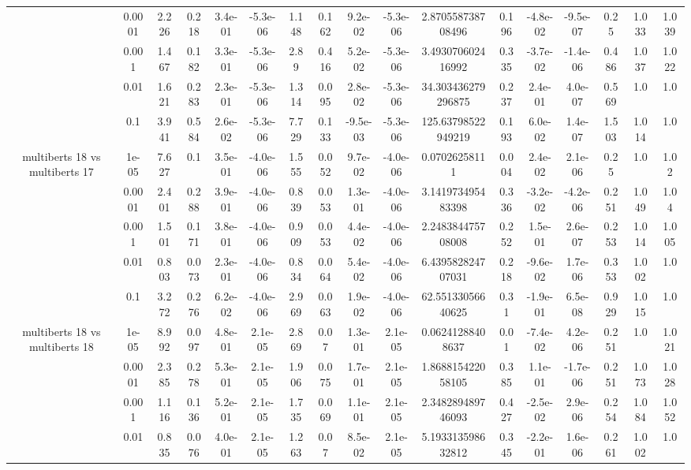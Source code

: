 \begin{tabular}{|c|c|c|c|c|c|c|c|c|c|c|c|c|c|c|c|c|}
 & 0.0001 & 2.226 & 0.218 & 3.4e-01 & -5.3e-06 & 1.148 & 0.162 & 9.2e-02 & -5.3e-06 & 2.870558738708496 & 0.196 & -4.8e-02 & -9.5e-07 & 0.25 & 1.033 & 1.039 \\
 & 0.001 & 1.467 & 0.182 & 3.3e-01 & -5.3e-06 & 2.89 & 0.416 & 5.2e-02 & -5.3e-06 & 3.493070602416992 & 0.335 & -3.7e-02 & -1.4e-06 & 0.486 & 1.037 & 1.022 \\
 & 0.01 & 1.621 & 0.283 & 2.3e-01 & -5.3e-06 & 1.314 & 0.095 & 2.8e-02 & -5.3e-06 & 34.303436279296875 & 0.237 & 2.4e-01 & 4.0e-07 & 0.569 & 1.0 & 1.0 \\
 & 0.1 & 3.941 & 0.584 & 2.6e-02 & -5.3e-06 & 7.729 & 0.133 & -9.5e-03 & -5.3e-06 & 125.63798522949219 & 0.193 & 6.0e-02 & 1.4e-07 & 1.503 & 1.014 & 1.0 \\
\hline
\multirow{5}{*}{multiberts 18 vs multiberts 17} & 1e-05 & 7.627 & 0.1 & 3.5e-01 & -4.0e-06 & 1.555 & 0.052 & 9.7e-02 & -4.0e-06 & 0.07026258111 & 0.004 & 2.4e-02 & 2.1e-06 & 0.25 & 1.0 & 1.02 \\
 & 0.0001 & 2.401 & 0.288 & 3.9e-01 & -4.0e-06 & 0.839 & 0.053 & 1.3e-01 & -4.0e-06 & 3.141973495483398 & 0.336 & -3.2e-02 & -4.2e-06 & 0.251 & 1.049 & 1.04 \\
 & 0.001 & 1.501 & 0.171 & 3.8e-01 & -4.0e-06 & 0.909 & 0.053 & 4.4e-02 & -4.0e-06 & 2.248384475708008 & 0.252 & 1.5e-01 & 2.6e-07 & 0.253 & 1.014 & 1.005 \\
 & 0.01 & 0.803 & 0.073 & 2.3e-01 & -4.0e-06 & 0.834 & 0.064 & 5.4e-02 & -4.0e-06 & 6.439582824707031 & 0.218 & -9.6e-02 & 1.7e-06 & 0.353 & 1.002 & 1.0 \\
 & 0.1 & 3.272 & 0.276 & 6.2e-02 & -4.0e-06 & 2.969 & 0.063 & 1.9e-02 & -4.0e-06 & 62.55133056640625 & 0.31 & -1.9e-01 & 6.5e-08 & 0.929 & 1.015 & 1.0 \\
\hline
\multirow{5}{*}{multiberts 18 vs multiberts 18} & 1e-05 & 8.992 & 0.097 & 4.8e-01 & 2.1e-05 & 2.869 & 0.07 & 1.3e-01 & 2.1e-05 & 0.06241288408637 & 0.01 & -7.4e-02 & 4.2e-06 & 0.251 & 1.0 & 1.021 \\
 & 0.0001 & 2.385 & 0.278 & 5.3e-01 & 2.1e-05 & 1.906 & 0.075 & 1.7e-01 & 2.1e-05 & 1.868815422058105 & 0.385 & 1.1e-01 & -1.7e-06 & 0.251 & 1.073 & 1.028 \\
 & 0.001 & 1.116 & 0.136 & 5.2e-01 & 2.1e-05 & 1.735 & 0.069 & 1.1e-01 & 2.1e-05 & 2.348289489746093 & 0.427 & -2.5e-02 & 2.9e-06 & 0.254 & 1.084 & 1.052 \\
 & 0.01 & 0.835 & 0.076 & 4.0e-01 & 2.1e-05 & 1.263 & 0.07 & 8.5e-02 & 2.1e-05 & 5.193313598632812 & 0.345 & -2.2e-01 & 1.6e-06 & 0.261 & 1.002 & 1.0 \\

\end{tabular}
